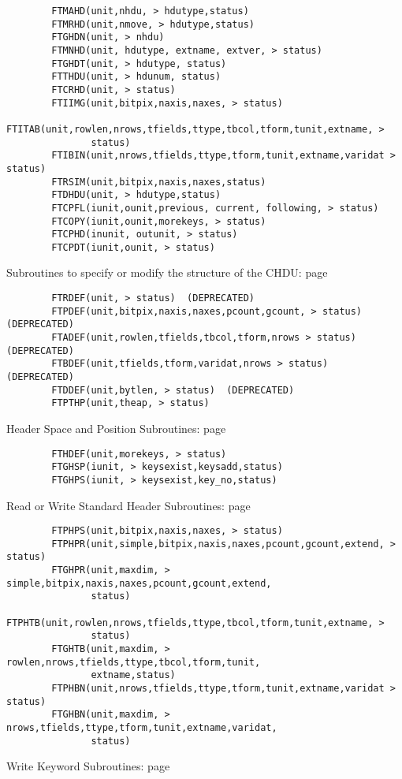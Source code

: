\documentclass[11pt]{book}
\begin{document}
\begin{verbatim}
        FTMAHD(unit,nhdu, > hdutype,status)
        FTMRHD(unit,nmove, > hdutype,status)
        FTGHDN(unit, > nhdu)
        FTMNHD(unit, hdutype, extname, extver, > status)
        FTGHDT(unit, > hdutype, status)
        FTTHDU(unit, > hdunum, status)
        FTCRHD(unit, > status)
        FTIIMG(unit,bitpix,naxis,naxes, > status)
        FTITAB(unit,rowlen,nrows,tfields,ttype,tbcol,tform,tunit,extname, >
               status)
        FTIBIN(unit,nrows,tfields,ttype,tform,tunit,extname,varidat > status)
        FTRSIM(unit,bitpix,naxis,naxes,status)
        FTDHDU(unit, > hdutype,status)
        FTCPFL(iunit,ounit,previous, current, following, > status)
        FTCOPY(iunit,ounit,morekeys, > status)
        FTCPHD(inunit, outunit, > status)
        FTCPDT(iunit,ounit, > status)
\end{verbatim}
 Subroutines to specify or modify the structure of the CHDU: page~\pageref{FTRDEF}

\begin{verbatim}
        FTRDEF(unit, > status)  (DEPRECATED)
        FTPDEF(unit,bitpix,naxis,naxes,pcount,gcount, > status)  (DEPRECATED)
        FTADEF(unit,rowlen,tfields,tbcol,tform,nrows > status)  (DEPRECATED)
        FTBDEF(unit,tfields,tform,varidat,nrows > status)  (DEPRECATED)
        FTDDEF(unit,bytlen, > status)  (DEPRECATED)
        FTPTHP(unit,theap, > status)
\end{verbatim}
 Header Space and Position Subroutines: page~\pageref{FTHDEF}

\begin{verbatim}
        FTHDEF(unit,morekeys, > status)
        FTGHSP(iunit, > keysexist,keysadd,status)
        FTGHPS(iunit, > keysexist,key_no,status)
\end{verbatim}
 Read or Write Standard Header Subroutines: page~\pageref{FTPHPR}

\begin{verbatim}
        FTPHPS(unit,bitpix,naxis,naxes, > status)
        FTPHPR(unit,simple,bitpix,naxis,naxes,pcount,gcount,extend, > status)
        FTGHPR(unit,maxdim, > simple,bitpix,naxis,naxes,pcount,gcount,extend,
               status)
        FTPHTB(unit,rowlen,nrows,tfields,ttype,tbcol,tform,tunit,extname, >
               status)
        FTGHTB(unit,maxdim, > rowlen,nrows,tfields,ttype,tbcol,tform,tunit,
               extname,status)
        FTPHBN(unit,nrows,tfields,ttype,tform,tunit,extname,varidat > status)
        FTGHBN(unit,maxdim, > nrows,tfields,ttype,tform,tunit,extname,varidat,
               status)
\end{verbatim}
 Write Keyword Subroutines: page~\pageref{FTPREC}
\end{document}
